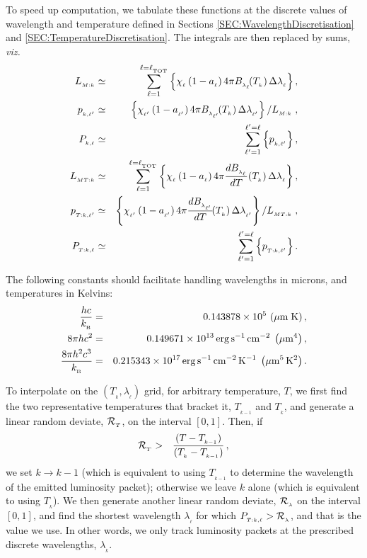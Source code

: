 \documentclass[usenatbib]{mn2e}
\numberwithin{equation}{section}
\begin{document}
To speed up computation, we tabulate these functions at the discrete values of wavelength and temperature defined in Sections \ref{SEC:WavelengthDiscretisation} and \ref{SEC:TemperatureDiscretisation}. The integrals are then replaced by sums, {\it viz.}
\begin{eqnarray}
L_{_{M:k}}&\simeq&\sum\limits_{\ell =1}^{\ell=\ell_{_{\rm TOT}}}\left\{\chi_{_\ell}\,(1-a_{_\ell})\,4\pi B_{_{\lambda_\ell}}\!(T_{_k})\,\Delta\lambda_{_\ell}\right\},\\\nonumber
p_{_{k,\ell'}}&\simeq&\left\{\chi_{_{\ell'}}\,(1-a_{_{\ell'}})\,4\pi B_{_{\lambda_{\ell'}}}\!(T_{_k})\,\Delta\lambda_{_{\ell'}}\right\}\left/L_{_{M:k}}\right.,\\
P_{_{k,\ell}}&\simeq&\sum\limits_{\ell'=1}^{\ell'=\ell}\left\{p_{_{k,\ell'}}\right\},\\
L_{_{MT:k}}&\simeq&\sum\limits_{\ell =1}^{\ell=\ell_{_{\rm TOT}}}\left\{\chi_{_\ell}\,(1-a_{_\ell})\,4\pi \frac{dB_{_{\lambda_\ell}}}{dT}(T_{_k})\,\Delta\lambda_{_\ell}\right\},\\\nonumber
p_{_{T:k,\ell'}}&\simeq&\left\{\chi_{_{\ell'}}\,(1-a_{_{\ell'}})\,4\pi \frac{dB_{_{\lambda_{\ell'}}}}{dT}\!(T_{_k})\,\Delta\lambda_{_{\ell'}}\right\}\left/L_{_{MT:k}}\right.,\\
P_{_{T:k,\ell}}&\simeq&\sum\limits_{\ell'=1}^{\ell'=\ell}\left\{p_{_{T:k,\ell'}}\right\}.
\end{eqnarray}

The following constants should facilitate handling wavelengths in microns, and temperatures in Kelvins:
\begin{eqnarray}
\frac{hc}{k_{_{\rm B}}}&=&0.143878\times 10^5\,\left(\mu{\rm m}\;{\rm K}\right),\\
8\pi hc^2&=&0.149671\times 10^{13}\,{\rm erg}\,{\rm s}^{-1}\,{\rm cm}^{-2}\;\left(\mu{\rm m}^4\right),\\\nonumber
\frac{8\pi h^2c^3}{k_{_{\rm B}}}&=&0.215343\times 10^{17}\,{\rm erg}\,{\rm s}^{-1}\,{\rm cm}^{-2}\,{\rm K}^{-1}\;\left(\mu{\rm m}^5\,{\rm K}^2\right).\\
\end{eqnarray}

To interpolate on the $(T_{_k},\lambda_{_\ell})$ grid, for arbitrary temperature, $T$, we first find the two representative temperatures that bracket it, $T_{_{k-1}}$ and $T_{_k}$, and generate a linear random deviate, ${\cal R}_{_T}$, on the interval $[0,1]$. Then, if
\begin{eqnarray}
{\cal R}_{_T}&>&\frac{(T-T_{_{k-1}})}{(T_{_k}-T_{_{k-1}})}\,,
\end{eqnarray}
we set $k\rightarrow k-1$ (which is equivalent to using $T_{_{k-1}}$ to determine the wavelength of the emitted luminosity packet); otherwise we leave $k$ alone (which is equivalent to using $T_{_k}$). We then generate another linear random deviate, ${\cal R}_{_\lambda}$ on the interval $[0,1]$, and find the shortest wavelength $\lambda_{_\ell}$ for which $P_{_{T:k,\ell}}>{\cal R}_{_\lambda}$, and that is the value we use. In other words, we only track luminosity packets at the prescribed discrete wavelengths, $\lambda_{_k}$.
\end{document}
